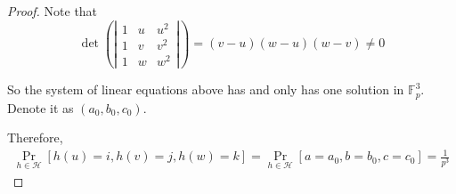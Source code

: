 \documentclass[12pt,a4]{article}
\newcounter{exercise}
\begin{document}
\begin{exercise}
\begin{enumerate}
\begin{proof}
				Note that
				\[
					\det
					\left(\left|
					\begin{matrix}
						1 & u & u^2 \\
						1 & v & v^2 \\
						1 & w & w^2
					\end{matrix}
					\right|\right)
					=
					(v - u)(w - u)(w - v)
					\neq
					0
				\]
				
				So the system of linear equations above has and only has one solution in $\mathbb{F}^{3}_{p}$.
				Denote it as $(a_0, b_0, c_0)$.
				
				Therefore,
				\begin{eqnarray*}
					\mathop{\text{Pr}} \limits_{h \in \mathcal{H}}[h(u) = i, h(v) = j, h(w) = k]
					= \mathop{\text{Pr}} \limits_{h \in \mathcal{H}}[a = a_0, b = b_0, c = c_0]
					= \frac{1}{p^3}
				\end{eqnarray*}
			\end{proof}
		
	\end{enumerate}
\end{exercise}
\end{document}
